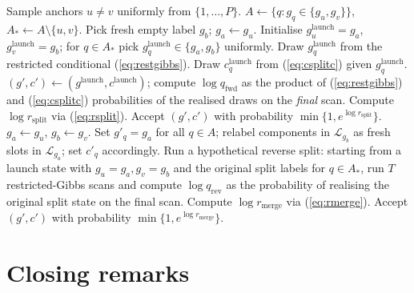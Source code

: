 \documentclass[11pt]{article}
\begin{document}
\begin{algorithm}[H]
\caption{One Jain--Neal cluster-level split--merge step.}
\label{alg:sm}
\begin{algorithmic}[1]
\State Sample anchors $u\ne v$ uniformly from $\{1,\ldots,P\}$.
\State $A\gets\{q:g_q\in\{g_u,g_v\}\}$, $A_*\gets A\setminus\{u,v\}$.
 
   \State Pick fresh empty label $g_b$; $g_a\gets g_u$.
   \State Initialise $g_u^{\mathrm{launch}}=g_a$, $g_v^{\mathrm{launch}}=g_b$;
          for $q\in A_*$ pick $g_q^{\mathrm{launch}}\in\{g_a,g_b\}$ uniformly.
         \State Draw $g_q^{\mathrm{launch}}$ from the restricted conditional (\ref{eq:restgibbs}).
         \State Draw $c_q^{\mathrm{launch}}$ from (\ref{eq:csplitc}) given $g_q^{\mathrm{launch}}$.
      \EndFor
   \EndFor
   \State $(g',c')\gets(g^{\mathrm{launch}},c^{\mathrm{launch}})$;
          compute $\log q_{\mathrm{fwd}}$ as the product of (\ref{eq:restgibbs}) and (\ref{eq:csplitc})
          probabilities of the realised draws on the \emph{final} scan.
   \State Compute $\log r_{\mathrm{split}}$ via (\ref{eq:rsplit}).
   \State Accept $(g',c')$ with probability $\min\{1,e^{\log r_{\mathrm{split}}}\}$.
\Else {}
   \State $g_a\gets g_u$, $g_b\gets g_v$.
   \State Set $g'_q=g_a$ for all $q\in A$; relabel components in
          $\mathcal{L}_{g_b}$ as fresh slots in $\mathcal{L}_{g_a}$;
          set $c'_q$ accordingly.
   \State Run a hypothetical reverse split: starting from a launch state
          with $g_u=g_a,g_v=g_b$ and the original split labels for
          $q\in A_*$, run $T$ restricted-Gibbs scans and compute
          $\log q_{\mathrm{rev}}$ as the probability of realising the
          original split state on the final scan.
   \State Compute $\log r_{\mathrm{merge}}$ via (\ref{eq:rmerge}).
   \State Accept $(g',c')$ with probability $\min\{1,e^{\log r_{\mathrm{merge}}}\}$.
\EndIf
\end{algorithmic}
\end{algorithm}

\section{Closing remarks}
\end{document}
